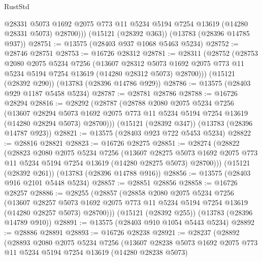 \begin{lexlean}{RustStd}
\begin{coremodule}
          @28331
          @5073
          @1692
          @2075
          @773
          @11
          @5234
          @5194
          @7254
          @13619
          (@14280 @28331 @5073)
          @28700)))
    (@15121 (@28392 @363))
    (@13783 (@28396 @14785 @937))
@28751 := @13575 (@28403 @937 @1068 @5463 @5234)
@28752 := @28746 @28751
@28753 := @16726 @28312
@28781 := @28311
    (@28752
      (@28753
        @2080
        @2075
        @5234
        @7256
        (@13607
          @28312
          @5073
          @1692
          @2075
          @773
          @11
          @5234
          @5194
          @7254
          @13619
          (@14280 @28312 @5073)
          @28700)))
    (@15121 (@28392 @290))
    (@13783 (@28396 @14786 @929))
@28786 := @13575 (@28403 @929 @1187 @5458 @5234)
@28787 := @28781 @28786
@28788 := @16726 @28294
@28816 := @28292
    (@28787
      (@28788
        @2080
        @2075
        @5234
        @7256
        (@13607
          @28294
          @5073
          @1692
          @2075
          @773
          @11
          @5234
          @5194
          @7254
          @13619
          (@14280 @28294 @5073)
          @28700)))
    (@15121 (@28392 @347))
    (@13783 (@28396 @14787 @923))
@28821 := @13575 (@28403 @923 @722 @5453 @5234)
@28822 := @28816 @28821
@28823 := @16726 @28275
@28851 := @28274
    (@28822
      (@28823
        @2080
        @2075
        @5234
        @7256
        (@13607
          @28275
          @5073
          @1692
          @2075
          @773
          @11
          @5234
          @5194
          @7254
          @13619
          (@14280 @28275 @5073)
          @28700)))
    (@15121 (@28392 @261))
    (@13783 (@28396 @14788 @916))
@28856 := @13575 (@28403 @916 @2101 @5448 @5234)
@28857 := @28851 @28856
@28858 := @16726 @28257
@28886 := @28255
    (@28857
      (@28858
        @2080
        @2075
        @5234
        @7256
        (@13607
          @28257
          @5073
          @1692
          @2075
          @773
          @11
          @5234
          @5194
          @7254
          @13619
          (@14280 @28257 @5073)
          @28700)))
    (@15121 (@28392 @255))
    (@13783 (@28396 @14789 @910))
@28891 := @13575 (@28403 @910 @1054 @5443 @5234)
@28892 := @28886 @28891
@28893 := @16726 @28238
@28921 := @28237
    (@28892
      (@28893
        @2080
        @2075
        @5234
        @7256
        (@13607
          @28238
          @5073
          @1692
          @2075
          @773
          @11
          @5234
          @5194
          @7254
          @13619
          (@14280 @28238 @5073)

\end{coremodule}
\end{lexlean}
